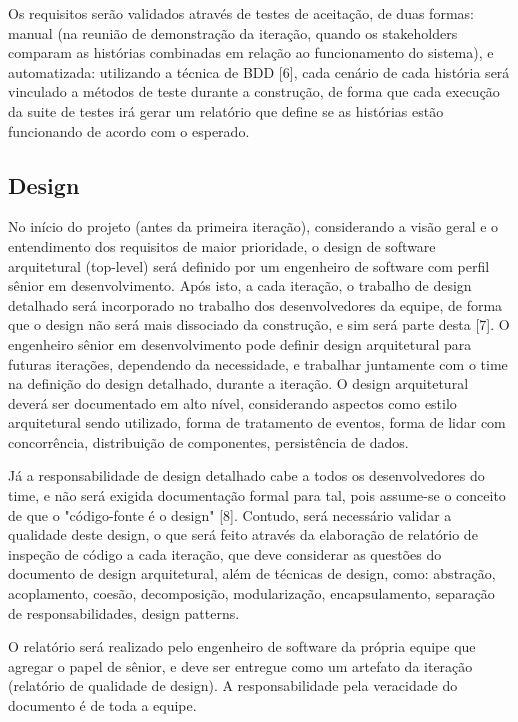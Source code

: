 \documentclass[12pt,journal,compsoc]{IEEEtran}
\begin{document}
Os requisitos serão validados através de testes de aceitação, de duas formas: manual (na reunião de demonstração da iteração, quando os stakeholders comparam as histórias combinadas em relação ao funcionamento do sistema), e automatizada: utilizando a técnica de BDD [6], cada cenário de cada história será vinculado a métodos de teste durante a construção, de forma que cada execução da suite de testes irá gerar um relatório que define se as histórias estão funcionando de acordo com o esperado.


\subsection{Design}

No início do projeto (antes da primeira iteração), considerando a visão geral e o entendimento dos requisitos de maior prioridade, o design de software arquitetural (top-level) será definido por um engenheiro de software com perfil sênior em desenvolvimento. Após isto, a cada iteração, o trabalho de design detalhado será incorporado no trabalho dos desenvolvedores da equipe, de forma que o design não será mais dissociado da construção, e sim será parte desta [7]. O engenheiro sênior em desenvolvimento pode definir design arquitetural para futuras iterações, dependendo da necessidade, e trabalhar juntamente com o time na definição do design detalhado, durante a iteração. O design arquitetural deverá ser documentado em alto nível, considerando aspectos como estilo arquitetural sendo utilizado, forma de tratamento de eventos, forma de lidar com concorrência, distribuição de componentes, persistência de dados.

Já a responsabilidade de design detalhado cabe a todos os desenvolvedores do time, e não será exigida documentação formal para tal, pois assume-se o conceito de que o "código-fonte é o design" [8]. Contudo, será necessário validar a qualidade deste design, o que será feito através da elaboração de relatório de inspeção de código a cada iteração, que deve considerar as questões do documento de design arquitetural, além de técnicas de design, como: abstração, acoplamento, coesão, decomposição, modularização, encapsulamento, separação de responsabilidades, design patterns. 

O relatório será realizado pelo engenheiro de software da própria equipe que agregar o papel de sênior, e deve ser entregue como um artefato da iteração (relatório de qualidade de design). A responsabilidade pela veracidade do documento é de toda a equipe.
\end{document}
